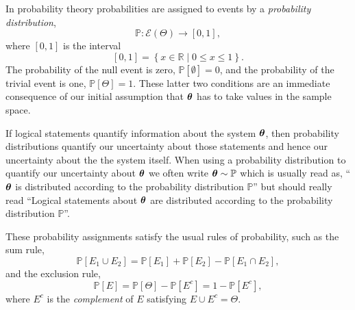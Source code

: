 \documentclass[11pt, oneside]{article}
\newcommand{\PP}{ \mathbb{P} }
\newcommand{\RR}{ \mathbb{R} }
\newcommand{\bt}{ \mbox{\boldmath{$\theta$}} }
\begin{document}
In probability theory probabilities are assigned to events by a \emph{probability 
distribution},
%
\begin{equation*}
\PP : \mathcal{E} \! \left( \Theta \right) \rightarrow \left[0, 1 \right],
\end{equation*}
%
where $\left[0, 1\right]$ is the interval
%
\begin{equation*}
\left[ 0, 1 \right] = \left\{ x \in \RR \mid 0 \le x \le 1 \right\}.
\end{equation*}
%
The probability of the null event is zero, 
$\PP \! \left[ \emptyset \right] = 0$, and the probability of the trivial
event is one, $\PP \! \left[ \Theta \right] = 1$.  These latter
two conditions are an immediate consequence of our initial
assumption that $\bt$ has to take values in the sample space.

If logical statements quantify information about the system $\bt$, 
then probability distributions quantify our uncertainty about those 
statements and hence our uncertainty about the the system itself.  
When using a probability distribution to 
quantify our uncertainty about $\bt$ we often write $\bt \sim \PP$ which 
is usually read as, ``$\bt$ is distributed according to the probability 
distribution $\PP$'' but should really read ``Logical statements about 
$\bt$ are distributed according to the probability distribution $\PP$''.

These probability assignments satisfy the usual rules of probability, 
such as the sum rule,
%
\begin{equation*}
\PP \! \left[ E_{1} \cup E_{2} \right]
= 
\PP \! \left[ E_{1} \right] + \PP \! \left[ E_{2} \right] 
- \PP \! \left[ E_{1} \cap E_{2} \right],
\end{equation*}
%
and the exclusion rule,
%
\begin{equation*}
\PP \! \left[ E \right] 
= 
\PP \! \left[ \Theta \right] - \PP \! \left[ E^{c} \right]
=
1 - \PP \! \left[ E^{c} \right],
\end{equation*}
%
where $E^{c}$ is the \emph{complement} of $E$ satisfying
$E \cup E^{c} = \Theta$.
\end{document}
